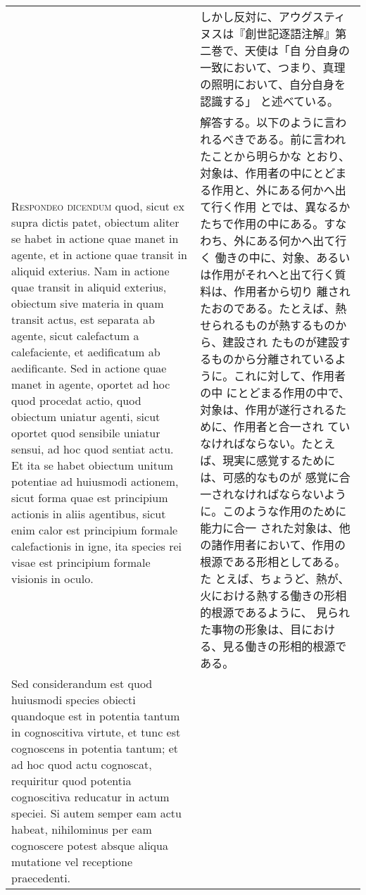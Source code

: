 \documentclass[10pt]{jsarticle} %
\begin{document}
\begin{longtable}{p{21em}p{21em}}
&

しかし反対に、アウグスティヌスは『創世記逐語注解』第二巻で、天使は「自
分自身の一致において、つまり、真理の照明において、自分自身を認識する」
と述べている。

\\


{\scshape Respondeo dicendum} quod, sicut ex supra dictis patet,
obiectum aliter se habet in actione quae manet in agente, et in
actione quae transit in aliquid exterius. Nam in actione quae transit
in aliquid exterius, obiectum sive materia in quam transit actus, est
separata ab agente, sicut calefactum a calefaciente, et aedificatum ab
aedificante. Sed in actione quae manet in agente, oportet ad hoc quod
procedat actio, quod obiectum uniatur agenti, sicut oportet quod
sensibile uniatur sensui, ad hoc quod sentiat actu. Et ita se habet
obiectum unitum potentiae ad huiusmodi actionem, sicut forma quae est
principium actionis in aliis agentibus, sicut enim calor est
principium formale calefactionis in igne, ita species rei visae est
principium formale visionis in oculo.


&

解答する。以下のように言われるべきである。前に言われたことから明らかな
とおり、対象は、作用者の中にとどまる作用と、外にある何かへ出て行く作用
とでは、異なるかたちで作用の中にある。すなわち、外にある何かへ出て行く
働きの中に、対象、あるいは作用がそれへと出て行く質料は、作用者から切り
離されたおのである。たとえば、熱せられるものが熱するものから、建設され
たものが建設するものから分離されているように。これに対して、作用者の中
にとどまる作用の中で、対象は、作用が遂行されるために、作用者と合一され
ていなければならない。たとえば、現実に感覚するためには、可感的なものが
感覚に合一されなければならないように。このような作用のために能力に合一
された対象は、他の諸作用者において、作用の根源である形相としてある。た
とえば、ちょうど、熱が、火における熱する働きの形相的根源であるように、
見られた事物の形象は、目における、見る働きの形相的根源である。

\\



Sed considerandum est quod huiusmodi species obiecti quandoque est in
potentia tantum in cognoscitiva virtute, et tunc est cognoscens in
potentia tantum; et ad hoc quod actu cognoscat, requiritur quod
potentia cognoscitiva reducatur in actum speciei. Si autem semper eam
actu habeat, nihilominus per eam cognoscere potest absque aliqua
mutatione vel receptione praecedenti.



\end{longtable}
\end{document}
